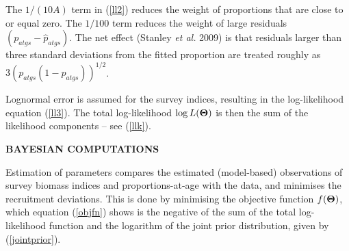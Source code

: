 \documentclass[11pt]{article}   %
\def\bfTh{{\bf \Theta}}          %
\newcommand{\eref}[1]{(\ref{#1})}
\begin{document}

The $1/(10 A)$ term in \eref{ll2} reduces the weight of proportions that are close to or equal zero. The $1/100$ term reduces the weight of large residuals $( p_{atgs} - \widehat{p}_{atgs} )$. The net effect (Stanley {\it et al.} 2009)\nocite{sso09} is that residuals larger than three standard deviations from the fitted proportion are treated roughly as $3 (p_{atgs} (1 - p_{atgs}))^{1/2}$. 


Lognormal error is assumed for the survey indices, resulting in the log-likelihood equation \eref{ll3}. The total log-likelihood $\log L(\bfTh)$ is then the sum of the likelihood components -- see \eref{llk}.





{\bf BAYESIAN COMPUTATIONS}

Estimation of parameters compares the estimated (model-based) observations of survey biomass indices and proportions-at-age with the data, and minimises the recruitment deviations. This is done by minimising the objective function $f(\bfTh)$, which equation \eref{objfn} shows is the negative of the sum of the total log-likelihood function and the logarithm of the joint prior distribution, given by \eref{jointprior}.
\end{document}
